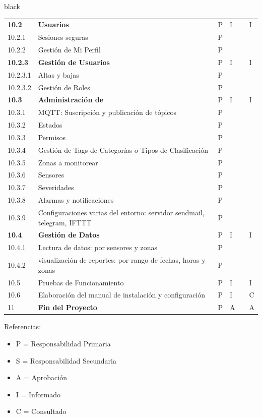 \documentclass[11pt]{charter}
\begin{document}
\begin{landscape}
\begin{consigna}{black}
\begin{tabularx}{\linewidth}{@{}|p{1.3cm}|p{9.3cm}|p{3cm}|p{3cm}|p{3cm}|p{3cm}|@{}}
\textbf{10.2} & \textbf{Usuarios} & P & I &  & I \\
10.2.1 & Sesiones seguras & P &  &  &  \\
10.2.2 & Gestión de Mi Perfil & P &  &  &  \\
\textbf{10.2.3} & \textbf{Gestión de Usuarios} & P & I &  & I \\
10.2.3.1 & Altas y bajas & P &  &  &  \\
10.2.3.2 & Gestión de Roles & P &  &  &  \\
\textbf{10.3} & \textbf{Administración de} & P & I &  & I \\
10.3.1 & MQTT: Suscripción y   publicación de tópicos & P &  &  &  \\
10.3.2 & Estados & P &  &  &  \\
10.3.3 & Permisos & P &  &  &  \\
10.3.4 & Gestión de Tags de Categorías   o Tipos de Clasificación & P &  &  &  \\
10.3.5 & Zonas a monitorear & P &  &  &  \\
10.3.6 & Sensores & P &  &  &  \\
10.3.7 & Severidades & P &  &  &  \\
10.3.8 & Alarmas y notificaciones & P &  &  &  \\
10.3.9 & Configuraciones varias del   entorno: servidor sendmail, telegram, IFTTT & P &  &  &  \\
\textbf{10.4} & \textbf{Gestión de Datos} & P & I &  & I \\
10.4.1 & Lectura de datos: por   sensores y zonas & P &  &  &  \\
10.4.2 & visualización de reportes:   por rango de fechas, horas y zonas & P &  &  &  \\
10.5 & Pruebas de Funcionamiento & P & I &  & I \\
10.6 & Elaboración del manual de instalación y   configuración & P & I &  & C \\
11 & \textbf{Fin del Proyecto} & P & A &  & A
\end{tabularx}

{\footnotesize
Referencias:
\begin{itemize}
	\item P = Responsabilidad Primaria
	\item S = Responsabilidad Secundaria
	\item A = Aprobación
	\item I = Informado
	\item C = Consultado
\end{itemize}
} %

%

\end{consigna}
\end{landscape}
\end{document}
